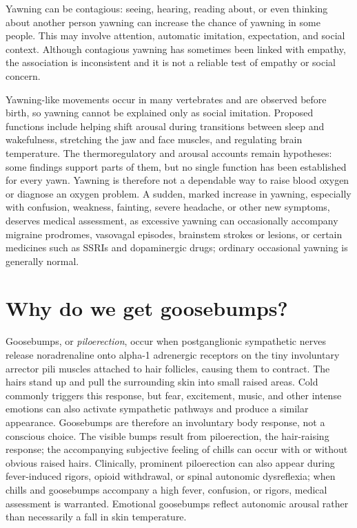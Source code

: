 \documentclass[11pt,oneside]{report}
\begin{document}
Yawning can be contagious: seeing, hearing, reading about, or even thinking
about another person yawning can increase the chance of yawning in some people.
This may involve attention, automatic imitation, expectation, and social
context. Although contagious yawning has sometimes been linked with empathy,
the association is inconsistent and it is not a reliable test of empathy or
social concern.

Yawning-like movements occur in many vertebrates and are observed before birth,
so yawning cannot be explained only as social imitation. Proposed functions
include helping shift arousal during transitions between sleep and wakefulness,
stretching the jaw and face muscles, and regulating brain temperature. The
thermoregulatory and arousal accounts remain hypotheses: some findings support
parts of them, but no single function has been established for every yawn.
Yawning is therefore not a dependable way to raise blood oxygen or diagnose an
oxygen problem. A sudden, marked increase in yawning, especially with confusion,
weakness, fainting, severe headache, or other new symptoms, deserves medical
assessment, as excessive yawning can occasionally accompany migraine prodromes,
vasovagal episodes, brainstem strokes or lesions, or certain medicines such as
SSRIs and dopaminergic drugs; ordinary occasional yawning is generally normal.

\section{Why do we get goosebumps?}

Goosebumps, or \emph{piloerection}, occur when postganglionic sympathetic
nerves release noradrenaline onto alpha-1 adrenergic receptors on the tiny
involuntary arrector pili muscles attached to hair follicles, causing them to
contract. The hairs stand up and pull the surrounding skin into small raised
areas. Cold commonly triggers this response, but fear, excitement, music, and
other intense emotions can also activate sympathetic pathways and produce a
similar appearance. Goosebumps are therefore an involuntary body response, not
a conscious choice. The visible bumps result from piloerection, the hair-raising
response; the accompanying subjective feeling of chills can occur with or
without obvious raised hairs. Clinically, prominent piloerection can also
appear during fever-induced rigors, opioid withdrawal, or spinal autonomic
dysreflexia; when chills and goosebumps accompany a high fever, confusion, or
rigors, medical assessment is warranted.
Emotional goosebumps reflect autonomic arousal rather than necessarily a fall
in skin temperature.
\end{document}
